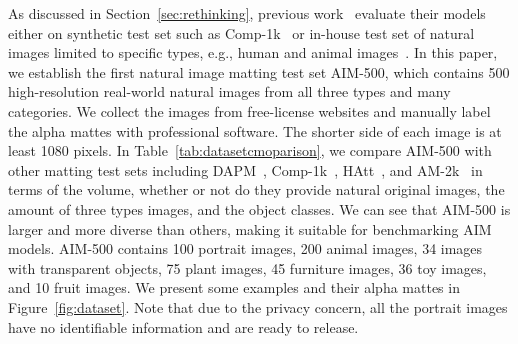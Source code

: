\documentclass{article}
\begin{document}
\begin{table}[b]
\footnotesize

\caption{Comparison between AIM-500 with other matting test set.}
\label{tab:datasetcmoparison}
\end{table}

As discussed in Section~\ref{sec:rethinking}, previous work~\cite{zhang2019late,Qiao_2020_CVPR} evaluate their models either on synthetic test set such as Comp-1k~\cite{xu2017deep} or in-house test set of natural images limited to specific types, e.g., human and animal images~\cite{gfm,chen2018semantic}. In this paper, we establish the first natural image matting test set AIM-500, which contains 500 high-resolution real-world natural images from all three types and many categories. We collect the images from free-license websites and manually label the alpha mattes with professional software. The shorter side of each image is at least 1080 pixels. In Table~\ref{tab:datasetcmoparison}, we compare AIM-500 with other matting test sets including DAPM~\cite{shen2016deep}, Comp-1k~\cite{xu2017deep}, HAtt~\cite{Qiao_2020_CVPR}, and AM-2k~\cite{gfm} in terms of the volume, whether or not do they provide natural original images, the amount of three types images, and the object classes. We can see that AIM-500 is larger and more diverse than others, making it suitable for benchmarking AIM models. AIM-500 contains 100 portrait images, 200 animal images, 34 images with transparent objects, 75 plant images, 45 furniture images, 36 toy images, and 10 fruit images. We present some examples and their alpha mattes in Figure~\ref{fig:dataset}. Note that due to the privacy concern, all the portrait images have no identifiable information and are ready to release.
\end{document}
